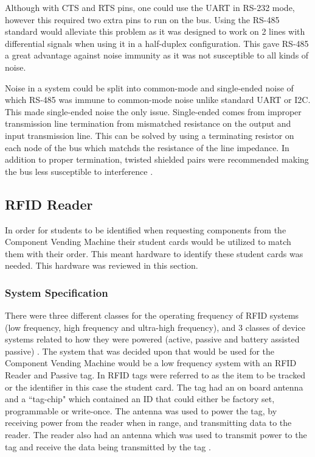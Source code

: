 \documentclass[a4paper,11pt]{article}
\numberwithin{figure}{section}
\numberwithin{table}{section}
\begin{document}
Although with CTS and RTS pins, one could use the UART in RS-232 mode, however this required two extra pins to run on the bus. Using the RS-485 standard would alleviate this problem as it was designed to work on 2 lines with differential signals when using it in a half-duplex configuration. This gave RS-485 a great advantage against noise immunity as it was not susceptible to all kinds of noise. 

Noise in a system could be split into common-mode and single-ended noise of which RS-485 was immune to common-mode noise unlike standard UART or I2C. This made single-ended noise the only issue. Single-ended comes from improper transmission line termination from mismatched resistance on the output and input transmission line. This can be solved by using a terminating resistor on each node of the bus which matchds the resistance of the line impedance. In addition to proper termination, twisted shielded pairs were recommended making the bus less susceptible to interference \cite{dif}. 

\subsection{RFID Reader}
In order for students to be identified when requesting components from the Component Vending Machine their student cards would be utilized to match them with their order. This meant hardware to identify these student cards was needed. This hardware was reviewed in this section.

\subsubsection{System Specification}
There were three different classes for the operating frequency of RFID systems (low frequency, high frequency and ultra-high frequency), and 3 classes of device systems related to how they were powered (active, passive and battery assisted passive) \cite{rfidsys}. The system that was decided upon that would be used for the Component Vending Machine would be a low frequency system with an RFID Reader and Passive tag. In RFID tags were referred to as the item to be tracked or the identifier in this case the student card. The tag had an on board antenna and a ``tag-chip" which contained an ID that could either be factory set, programmable or write-once. The antenna was used to power the tag, by receiving power from the reader when in range, and transmitting data to the reader. The reader also had an antenna which was used to transmit power to the tag and receive the data being transmitted by the tag \cite{rfidhow}.
\end{document}
